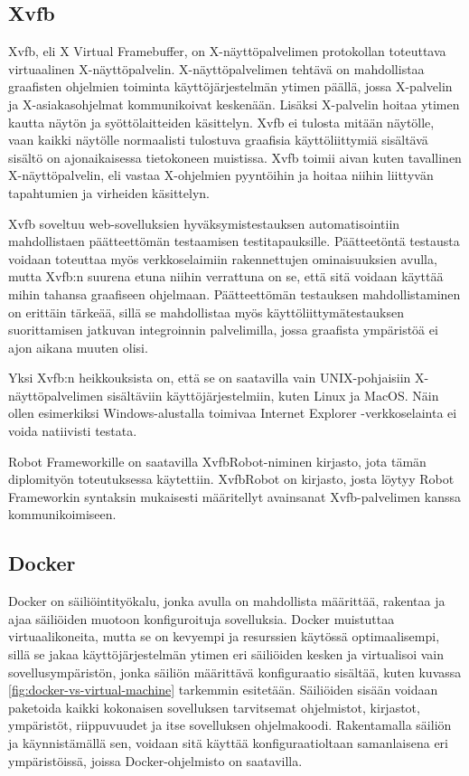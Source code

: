   \subsection{Xvfb} \label{ch:08_xvfb}

    Xvfb, eli X Virtual Framebuffer, on X-näyt\-tö\-pal\-ve\-li\-men  protokollan toteuttava virtuaalinen X-näyt\-tö\-pal\-ve\-lin.
    X-näyt\-tö\-pal\-ve\-li\-men tehtävä on mahdollistaa graafisten ohjelmien toiminta käyttöjärjestelmän ytimen päällä, jossa X-palvelin ja X-asiakasohjelmat kommunikoivat keskenään.
    Lisäksi X-palvelin hoitaa ytimen kautta näytön ja syöttölaitteiden käsittelyn.
    Xvfb ei tulosta mitään näytölle, vaan kaikki näytölle normaalisti tulostuva graafisia käyttöliittymiä sisältävä sisältö on ajonaikaisessa tietokoneen muistissa.
    Xvfb toimii aivan kuten tavallinen X-näyt\-tö\-pal\-ve\-lin, eli vastaa X-ohjelmien pyyntöihin ja hoitaa niihin liittyvän tapahtumien ja virheiden käsittelyn. \cite{xvfb_info}

    Xvfb soveltuu web-sovelluksien hyväksymistestauksen automatisointiin mahdollistaen päätteettömän testaamisen testitapauksille.
    Päätteetöntä testausta voidaan toteuttaa myös verkkoselaimiin rakennettujen ominaisuuksien avulla, mutta Xvfb:n suurena etuna niihin verrattuna on se, että sitä voidaan käyttää mihin tahansa graafiseen ohjelmaan.
    Päätteettömän testauksen mahdollistaminen on erittäin tärkeää, sillä se mahdollistaa myös käyttöliittymätestauksen suorittamisen jatkuvan integroinnin palvelimilla, jossa graafista ympäristöä ei ajon aikana muuten olisi.

    Yksi Xvfb:n heikkouksista on, että se on saatavilla vain UNIX-pohjaisiin X-näyt\-tö\-pal\-ve\-li\-men sisältäviin käyttöjärjestelmiin, kuten Linux ja MacOS.
    Näin ollen esimerkiksi Windows-alustalla toimivaa Internet Explorer -verkkoselainta ei voida natiivisti testata.

    Robot Frameworkille on saatavilla XvfbRobot-niminen kirjasto, jota tämän diplomityön toteutuksessa käytettiin.
    XvfbRobot on kirjasto, josta löytyy Robot Frameworkin syntaksin mukaisesti määritellyt avainsanat Xvfb-palvelimen kanssa kommunikoimiseen.

  \subsection{Docker} \label{ch:08_docker}

    Docker on säiliöintityökalu, jonka avulla on mahdollista määrittää, rakentaa ja ajaa säiliöiden muotoon konfiguroituja sovelluksia.
    Docker muistuttaa virtuaalikoneita, mutta se on kevyempi ja resurssien käytössä optimaalisempi, sillä se jakaa käyttöjärjestelmän ytimen eri säiliöiden kesken ja virtualisoi vain sovellusympäristön, jonka säiliön määrittävä konfiguraatio sisältää, kuten kuvassa \ref{fig:docker-vs-virtual-machine} tarkemmin esitetään.
    Säiliöiden sisään voidaan paketoida kaikki kokonaisen sovelluksen tarvitsemat ohjelmistot, kirjastot, ympäristöt, riippuvuudet ja itse sovelluksen ohjelmakoodi.
    Rakentamalla säiliön ja käynnistämällä sen, voidaan sitä käyttää konfiguraatioltaan samanlaisena eri ympäristöissä, joissa Docker-ohjelmisto on saatavilla.  \cite{docker_docs_info}

